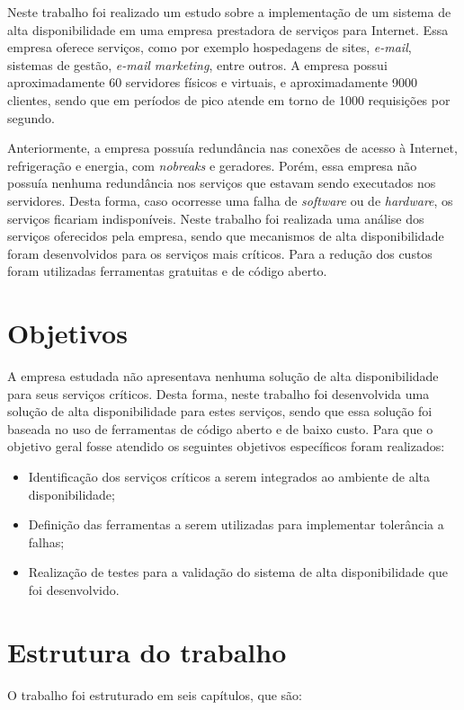Neste trabalho foi realizado um estudo sobre a implementação de um sistema de alta disponibilidade em uma empresa prestadora de serviços para 
Internet. Essa empresa oferece serviços, como por exemplo hospedagens de sites, \textit{e-mail}, sistemas de gestão, \textit{e-mail marketing}, 
entre outros. A empresa possui aproximadamente 60 servidores físicos e virtuais, e aproximadamente 9000 clientes, 
sendo que em períodos de pico atende em torno de 1000 requisições por segundo. 

Anteriormente, a empresa possuía redundância nas conexões de acesso à Internet, refrigeração e energia, com \textit{nobreaks} e geradores. 
Porém, essa empresa não possuía nenhuma redundância nos serviços que estavam sendo executados nos servidores. Desta forma, caso ocorresse
uma falha de \textit{software} ou de \textit{hardware}, os serviços ficariam indisponíveis. Neste trabalho foi realizada uma análise dos 
serviços oferecidos pela empresa, sendo que mecanismos de alta disponibilidade foram desenvolvidos para os serviços mais críticos. 
Para a redução dos custos foram utilizadas ferramentas gratuitas e de código aberto.

\section{Objetivos}
A empresa estudada não apresentava nenhuma solução de alta disponibilidade para seus serviços críticos. Desta forma, neste trabalho 
foi desenvolvida uma solução de alta disponibilidade para estes serviços, sendo que essa solução foi baseada no uso de ferramentas de 
código aberto e de baixo custo. Para que o objetivo geral fosse atendido os seguintes objetivos específicos foram realizados:

\begin{itemize}
\item Identificação dos serviços críticos a serem integrados ao ambiente de alta disponibilidade;
\item Definição das ferramentas a serem utilizadas para implementar tolerância a falhas;
\item Realização de testes para a validação do sistema de alta disponibilidade que foi desenvolvido.
\end{itemize}

\section{Estrutura do trabalho}
O trabalho foi estruturado em seis capítulos, que são:

